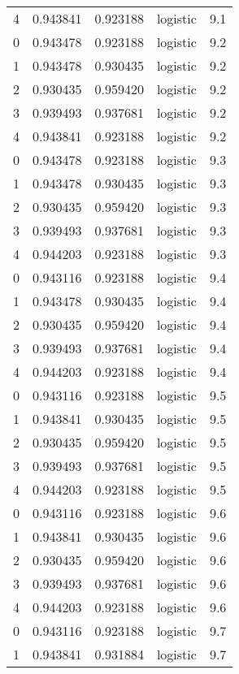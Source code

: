 \begin{tabular}{rrrlr}
     4 & 0.943841 & 0.923188 & logistic &        9.1 \\
     0 & 0.943478 & 0.923188 & logistic &        9.2 \\
     1 & 0.943478 & 0.930435 & logistic &        9.2 \\
     2 & 0.930435 & 0.959420 & logistic &        9.2 \\
     3 & 0.939493 & 0.937681 & logistic &        9.2 \\
     4 & 0.943841 & 0.923188 & logistic &        9.2 \\
     0 & 0.943478 & 0.923188 & logistic &        9.3 \\
     1 & 0.943478 & 0.930435 & logistic &        9.3 \\
     2 & 0.930435 & 0.959420 & logistic &        9.3 \\
     3 & 0.939493 & 0.937681 & logistic &        9.3 \\
     4 & 0.944203 & 0.923188 & logistic &        9.3 \\
     0 & 0.943116 & 0.923188 & logistic &        9.4 \\
     1 & 0.943478 & 0.930435 & logistic &        9.4 \\
     2 & 0.930435 & 0.959420 & logistic &        9.4 \\
     3 & 0.939493 & 0.937681 & logistic &        9.4 \\
     4 & 0.944203 & 0.923188 & logistic &        9.4 \\
     0 & 0.943116 & 0.923188 & logistic &        9.5 \\
     1 & 0.943841 & 0.930435 & logistic &        9.5 \\
     2 & 0.930435 & 0.959420 & logistic &        9.5 \\
     3 & 0.939493 & 0.937681 & logistic &        9.5 \\
     4 & 0.944203 & 0.923188 & logistic &        9.5 \\
     0 & 0.943116 & 0.923188 & logistic &        9.6 \\
     1 & 0.943841 & 0.930435 & logistic &        9.6 \\
     2 & 0.930435 & 0.959420 & logistic &        9.6 \\
     3 & 0.939493 & 0.937681 & logistic &        9.6 \\
     4 & 0.944203 & 0.923188 & logistic &        9.6 \\
     0 & 0.943116 & 0.923188 & logistic &        9.7 \\
     1 & 0.943841 & 0.931884 & logistic &        9.7 \\

\end{tabular}
